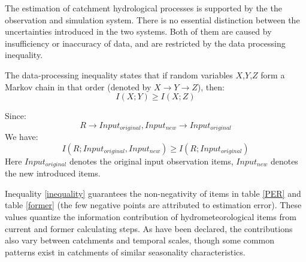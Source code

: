 The estimation of catchment hydrological processes is supported by the   the observation and simulation system. There is no essential distinction between the uncertainties introduced in the two systems. Both of them are caused by insufficiency or inaccuracy of data, and are restricted by the data processing inequality\citep{cover2012elements}.

The data-processing inequality states that if random variables $X$,$Y$,$Z$ form a Markov chain in that order (denoted by $X \rightarrow Y \rightarrow Z$), then:
\begin{equation}
I(X;Y) \geq I(X;Z)
\end{equation}
\iffalse
Since:
\begin{equation}
R \rightarrow R \rightarrow Input
\end{equation}
We have:
\begin{equation}
\label{a}
I(R;R) \geq I(R;Input)
\end{equation}
According to the definition, 
\begin{equation}
\label{a}
I(R;R)=h(R)
\end{equation}
\fi
Since:
\begin{equation}
R \rightarrow Input_{original},Input_{new} \rightarrow Input_{original}
\end{equation} 
We have:
\begin{equation}
\label{inequality}
I(R;Input_{original},Input_{new}) \geq I(R;Input_{original})
\end{equation}
Here $Input_{original}$ denotes the original input observation items, $Input_{new}$ denotes the new introduced items.  

Inequality \ref{inequality} guarantees the non-negativity of items in table \ref{PER} and table \ref{former} (the few negative points are attributed to estimation error).  
These values quantize the information contribution of  hydrometeorological items from current and former calculating steps. As have been declared, the contributions also vary between catchments and temporal scales, though some common patterns exist in catchments of similar seasonality characteristics.

